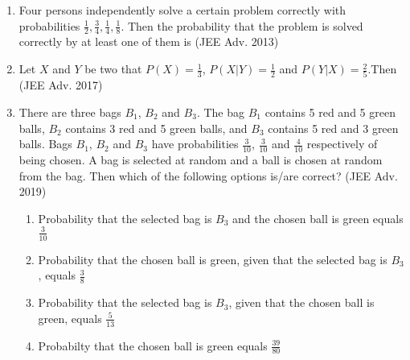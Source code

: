 \documentclass[journal,,12pt,onecolumn]{IEEEtran}
\theoremstyle{remark}
\begin{document}
\begin{enumerate}
\begin{enumerate}
        \end{enumerate}
        \item Four persons independently solve a certain problem correctly with probabilities $\frac{1}{2},\frac{3}{4},\frac{1}{4},\frac{1}{8}$. Then the probability that the problem is solved correctly by at least one of them is 
        \hfill{(JEE Adv. 2013)}
        \begin{enumerate}
        \end{enumerate}
\item Let $X$ and $Y$ be two that $P(X)=\frac{1}{3}$, $P(X|Y)=\frac{1}{2}$ and $P(Y|X)=\frac{2}{5}$.Then 
        \hfill{(JEE Adv. 2017)}
        \begin{enumerate}
        \end{enumerate}
    \item There are three bags $B_1$, $B_2$ and $B_3$. The bag $B_1$ contains 5 red and 5 green balls, $B_2$ contains 3 red and 5 green balls, and $B_3$ contains 5 red and 3 green balls. Bags $B_1$, $B_2$ and $B_3$ have probabilities $\frac{3}{10}$, $\frac{3}{10}$ and $\frac{4}{10}$ respectively of being chosen. A bag is selected at random and a ball is chosen at random from the bag. Then which of the following options is/are correct?
    \hfill{(JEE Adv. 2019)}
    \begin{enumerate}
    
        \item Probability that the selected bag is $B_3$ and the chosen ball is green equals $\frac{3}{10}$
        \item Probability that the chosen ball is green, given that the selected bag is $B_3$, equals $\frac{3}{8}$
        \item Probability that the selected bag is $B_3$, given that the chosen ball is green, equals $\frac{5}{13}$
        \item Probabilty that the chosen ball is green equals $\frac{39}{80}$
       \end{enumerate}
       \end{enumerate}
\end{document}

